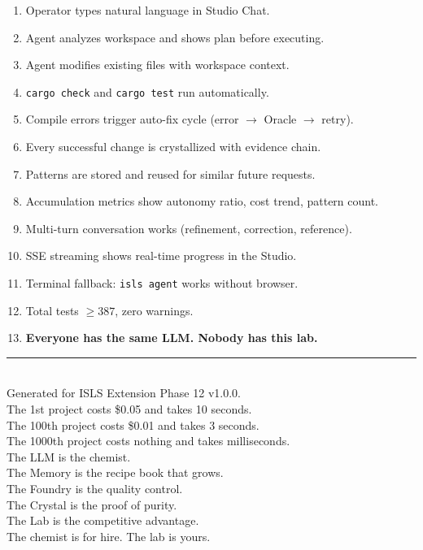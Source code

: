 \documentclass[11pt,a4paper,twoside]{article}
\theoremstyle{definition}
\theoremstyle{remark}
\newcommand{\ISLS}{\textsf{ISLS}}
\begin{document}
\begin{enumerate}[nosep]
  \item Operator types natural language in Studio Chat.
  \item Agent analyzes workspace and shows plan before executing.
  \item Agent modifies existing files with workspace context.
  \item \texttt{cargo check} and \texttt{cargo test} run automatically.
  \item Compile errors trigger auto-fix cycle (error $\to$ Oracle $\to$
        retry).
  \item Every successful change is crystallized with evidence chain.
  \item Patterns are stored and reused for similar future requests.
  \item Accumulation metrics show autonomy ratio, cost trend, pattern
        count.
  \item Multi-turn conversation works (refinement, correction,
        reference).
  \item SSE streaming shows real-time progress in the Studio.
  \item Terminal fallback: \texttt{isls agent} works without browser.
  \item Total tests $\ge 387$, zero warnings.
  \item \textbf{Everyone has the same LLM. Nobody has this lab.}
\end{enumerate}


\vfill
\begin{center}
\rule{0.5\textwidth}{0.4pt}\\[0.5cm]
{\small Generated for \ISLS{} Extension Phase 12 v1.0.0.\\[0.2cm]
The 1st project costs \$0.05 and takes 10 seconds.\\
The 100th project costs \$0.01 and takes 3 seconds.\\
The 1000th project costs nothing and takes milliseconds.\\[0.3cm]
The LLM is the chemist.\\
The Memory is the recipe book that grows.\\
The Foundry is the quality control.\\
The Crystal is the proof of purity.\\
The Lab is the competitive advantage.\\[0.3cm]
The chemist is for hire. The lab is yours.}
\end{center}
\end{document}

